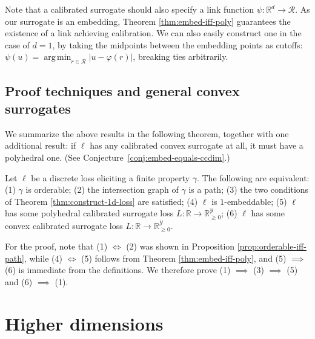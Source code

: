 \documentclass[anon]{colt2020} %
\newcommand{\reals}{\mathbb{R}}
\newcommand{\nonnegreals}{\reals_{\geq 0}}%
\newcommand{\R}{\mathcal{R}}
\newcommand{\Y}{\mathcal{Y}}
\DeclareMathOperator*{\argmin}{arg\,min}
\begin{document}
Note that a calibrated surrogate should also specify a link function $\psi: \reals^d \to \R$.
As our surrogate is an embedding, Theorem \ref{thm:embed-iff-poly} guarantees the existence of a link achieving calibration.
We can also easily construct one in the case of $d=1$, by taking the midpoints between the embedding points as cutoffs: $\psi(u) = \argmin_{r \in \R} |u - \varphi(r)|$, breaking ties arbitrarily.

\subsection{Proof techniques and general convex surrogates}
\label{sec:1d-proof-discuss}

We summarize the above results in the following theorem, together with one additional result: if $\ell$ has any calibrated convex surrogate at all, it must have a polyhedral one.
(See Conjecture~\ref{conj:embed-equals-ccdim}.)
\begin{theorem} \label{thm:1d-tfae}
  Let $\ell$ be a discrete loss eliciting a finite property $\gamma$.
  The following are equivalent: (1) $\gamma$ is orderable; (2) the intersection graph of $\gamma$ is a path; (3) the two conditions of Theorem \ref{thm:construct-1d-loss} are satisfied; (4) $\ell$ is $1$-embeddable; (5) $\ell$ has some polyhedral calibrated surrogate loss $L: \reals \to \nonnegreals^{\Y}$; (6) $\ell$ has some convex calibrated surrogate loss $L: \reals \to \nonnegreals^{\Y}$.
\end{theorem}

For the proof, note that
(1) $\iff$ (2) was shown in Proposition \ref{prop:orderable-iff-path}, while
(4) $\iff$ (5) follows from Theorem \ref{thm:embed-iff-poly}, and (5) $\implies$ (6) is immediate from the definitions.
We therefore prove (1) $\implies$ (3) $\implies$ (5) and (6) $\implies$ (1).

\section{Higher dimensions}\label{sec:d-dim}
\end{document}
